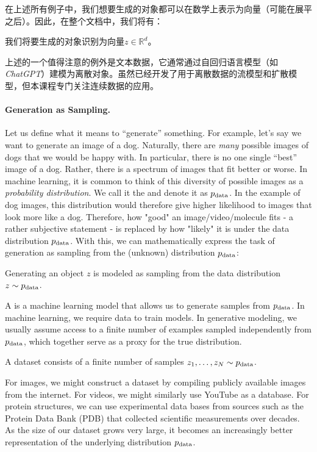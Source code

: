 在上述所有例子中，我们想要生成的对象都可以在数学上表示为向量（可能在展平之后）。因此，在整个文档中，我们将有：
\begin{ideabox}[对象作为向量]
    我们将要生成的对象识别为向量$z \in \mathbb{R}^d$。
\end{ideabox}
上述的一个值得注意的例外是文本数据，它通常通过自回归语言模型（如\emph{ChatGPT}）建模为离散对象。虽然已经开发了用于离散数据的流模型和扩散模型，但本课程专门关注连续数据的应用。


\paragraph{Generation as Sampling.}Let us define what it means to ``generate'' something. For example, let's say we want to generate an image of a dog. Naturally, there are \emph{many} possible images of dogs that we would be happy with. In particular, there is no one single ``best'' image of a dog. Rather, there is a spectrum of images that fit better or worse. In machine learning, it is common to think of this diversity of possible images as a \emph{probability distribution}. We call it the  and denote it as $p_{\rm{data}}$. In the example of dog images, this distribution would therefore give higher likelihood to images that look more like a dog. Therefore, how "good" an image/video/molecule fits - a rather subjective statement - is replaced by how "likely" it is under the data distribution $p_{\rm{data}}$. With this, we can mathematically express the task of generation as sampling from the (unknown) distribution $p_{\rm{data}}$:
\begin{ideabox}
    Generating an object $z$ is modeled as sampling from the data distribution $z\sim p_{\rm{data}}$.
\end{ideabox}
A  is a machine learning model that allows us to generate samples from $p_{\rm{data}}$. In machine learning, we require data to train models. In generative modeling, we usually assume access to a finite number of examples sampled independently from $p_{\rm{data}}$, which together serve as a proxy for the true distribution.
\begin{ideabox}[Dataset]
    A dataset consists of a finite number of samples $z_1, \dots, z_N \sim p_{\rm{data}}$.
\end{ideabox}
For images, we might construct a dataset by compiling publicly available images from the internet. For videos, we might similarly use YouTube as a database. For protein structures, we can use experimental data bases from sources such as the Protein Data Bank (PDB) that collected scientific measurements over decades. As the size of our dataset grows very large, it becomes an increasingly better representation of the underlying distribution $p_{\rm{data}}$.

